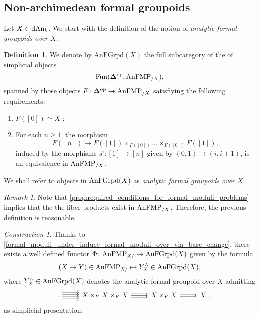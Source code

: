 \documentclass[10pt,a4paper,reqno]{amsart} %
\theoremstyle{plain}
\theoremstyle{definition}
\newtheorem{defin}[thm]{Definition}
\theoremstyle{remark}
\newtheorem{rem}[thm]{Remark}
\numberwithin{equation}{section}
\newtheorem{construction}[thm]{Construction}
\begin{document}
\subsection{Non-archimedean formal groupoids} Let $X \in \mathrm{dAn}_k$.
We start with the definition of the notion of \emph{analytic formal groupoids over $X$}:

\begin{defin}We denote by
    $\mathrm{AnFGrpd}(X)$ the full subcategory of the \infcat of simplicial objects
        \[
            \operatorname{Fun}( \bm{\Delta} ^\mathrm{op}, \mathrm{AnFMP}_{/X}),
        \]
    spanned by those objects $F \colon \mathbf \Delta ^\mathrm{op} \to \mathrm{AnFMP}_{/X}$ satisfiying the following requirements:
        \begin{enumerate}
            \item $F([0]) \simeq X$ ;
            \item For each $n \ge 1$, the morphism
                \[
                    F([n]) \to F([1]) \times_{F([0])} \dots \times_{F([0])} F([1])  ,
                \]
            induced by the morphisms $s^i \colon [1] \to [n]$ given by $(0,1) \mapsto (i, i+1)$, is an equivalence
            in $\mathrm{AnFMP}_{/X}$.
        \end{enumerate}
    We shall refer to objects in $\mathrm{AnFGrpd}(X)$ as \emph{analytic formal groupoids over $X$}.
\end{defin}

\begin{rem}
    Note that \cref{prop:required_conditions_for_formal_moduli_problems} implies that the the fiber products exist in $\mathrm{AnFMP}_{/X}$. Therefore, the previous
    definition is reasonable.
\end{rem}



\begin{construction} \label{const:formal_completion_construction_Phi} Thanks to \cref{formal_moduli_under_induce_formal_moduli_over_via_base_change},
there exists a well defined functor $\Phi \colon \mathrm{AnFMP}_{X/} \to \mathrm{AnFGrpd}(X)$ given by the formula
    \[
        (X \to Y ) \in \mathrm{AnFMP}_{X/ } \mapsto Y^\wedge_X \in \mathrm{AnFGrpd}(X),
    \]
where $Y^\wedge_X \in \mathrm{AnFGrpd}(X)$ denotes the analytic formal groupoid over $X$ admitting
    \[
    \begin{tikzcd}
      \dots \ar[r, shift left=2] \ar[r, shift left=0.75] 
      \ar[r, shift left=-0.75] \ar[r, shift left=-2]
      & X \times_Y X \times_Y X \ar[r, shift left=-1] \ar[r, shift left=1] \ar[r] 
      & X \times_Y X \ar[r, shift left=-0.25ex] \ar[r, shift left=0.25ex] 
      & X 
    \end{tikzcd},
    \] 
as simplicial presentation.
\end{construction}
\end{document}
